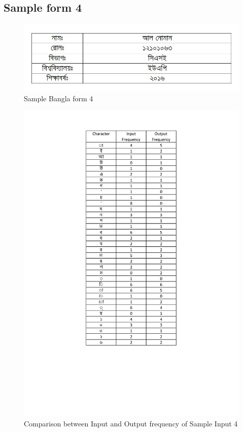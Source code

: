 \subsection{Sample form 4}
\begin{figure}[H]
\centering
\includegraphics[width=1\textwidth]{formBen04.JPG}
\caption {Sample Bangla form 4}
\label {fig:FormBan4}
\end{figure}
\begin{figure}[H]
\centering
\includegraphics[width=1\textwidth \frame]{BTform4}
\caption {Comparison between Input and Output frequency of Sample Input 4}
\label {fig:BTform4}
\end{figure}
